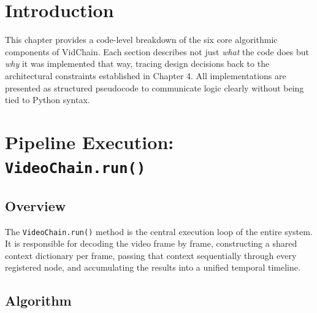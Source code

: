 \section{Introduction}

This chapter provides a code-level breakdown of the six core algorithmic components of VidChain. Each section describes not just \textit{what} the code does but \textit{why} it was implemented that way, tracing design decisions back to the architectural constraints established in Chapter 4. All implementations are presented as structured pseudocode to communicate logic clearly without being tied to Python syntax.

\section{Pipeline Execution: \texttt{VideoChain.run()}}

\subsection{Overview}

The \texttt{VideoChain.run()} method is the central execution loop of the entire system. It is responsible for decoding the video frame by frame, constructing a shared context dictionary per frame, passing that context sequentially through every registered node, and accumulating the results into a unified temporal timeline.

\subsection{Algorithm}

